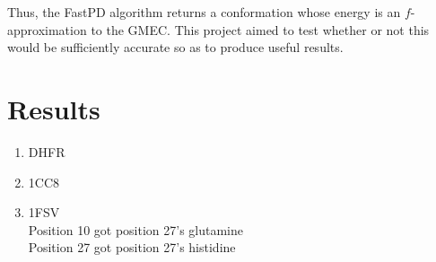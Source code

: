 \documentclass[11pt]{article}
\begin{document}
	Thus, the FastPD algorithm returns a conformation whose energy is an $f$-
	approximation to the GMEC. This project aimed to test whether or not this would
	be sufficiently accurate so as to produce useful results. 

	\section{Results}
	
	\begin{enumerate}
		\item DHFR
		\item 1CC8
		\item 1FSV\\
		Position 10 got position 27's glutamine\\
		Position 27 got position 27's histidine
	\end{enumerate}
\end{document}
